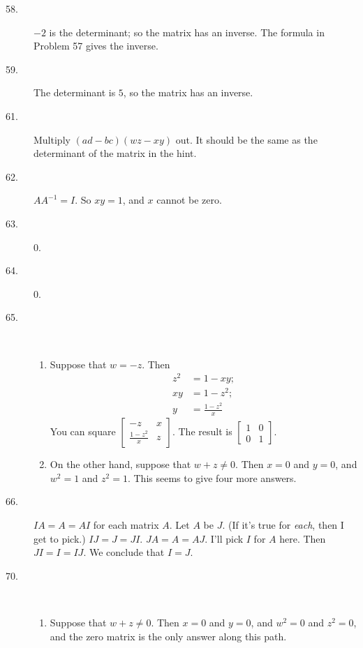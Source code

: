 \documentclass{article}
\begin{document}
\begin{description}

  \item[58.] $-2$ is the determinant; so the matrix has an inverse. The formula in Problem 57 gives the inverse.

  \item[59.] The determinant is $5$, so the matrix has an inverse.

  \item[61.] Multiply $(ad-bc) (wz-xy)$ out. It should be the same as the determinant of the matrix in the hint.

  \item[62.] $AA^{-1} = I$. So $xy = 1$, and $x$ cannot be zero.

  \item[63.] $0$.

  \item[64.] $0$.

  \item[65.] $\ $
    \begin{enumerate}[\hspace{1cm}(I)]
      \item Suppose that $w = -z$. Then
        \begin{align*}
          z^2 & = 1-xy; \\ 
          xy & = 1-z^2; \\ 
          y & = \frac{1-z^2}{x}
        \end{align*}
        You can square $\begin{bmatrix} -z & x \\ \frac{1-z^2}{x} & z \end{bmatrix}$. The result is $\begin{bmatrix} 1 & 0 \\ 0 & 1 \end{bmatrix}$.
      \item On the other hand, suppose that $w+z \neq 0$. Then $x=0$ and $y=0$, and $w^2 = 1$ and $z^2 = 1$. This seems to give four more answers.
    \end{enumerate}

  \item[66.] $IA = A = AI$ for each matrix $A$. Let $A$ be $J$. (If it's true for \emph{each}, then I get to pick.) $IJ = J = JI$. $JA = A = AJ$. I'll pick $I$ for $A$ here. Then $JI = I = IJ$. We conclude that $I = J$. 

  \item[70.] $\ $
    \begin{enumerate}[\hspace{1cm}(I)]
      \item Suppose that $w+z \neq 0$. Then $x=0$ and $y=0$, and $w^2 = 0$ and $z^2 = 0$, and the zero matrix is the only answer along this path.


\end{enumerate}
\end{description}
\end{document}
